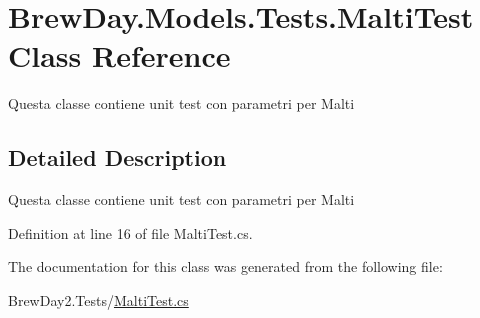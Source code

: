 \hypertarget{class_brew_day_1_1_models_1_1_tests_1_1_malti_test}{}\section{Brew\+Day.\+Models.\+Tests.\+Malti\+Test Class Reference}
\label{class_brew_day_1_1_models_1_1_tests_1_1_malti_test}


Questa classe contiene unit test con parametri per Malti 




\subsection{Detailed Description}
Questa classe contiene unit test con parametri per Malti



Definition at line 16 of file Malti\+Test.\+cs.



The documentation for this class was generated from the following file\+:\begin{DoxyCompactItemize}
\item 
Brew\+Day2.\+Tests/\mbox{\hyperlink{_malti_test_8cs}{Malti\+Test.\+cs}}\end{DoxyCompactItemize}
